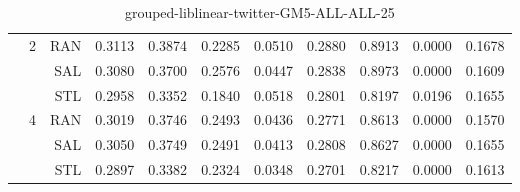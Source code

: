 \begin{center}
\begin{table}[htbp]
\begin{tabular}{ | r | r | r | r | r | r | r | r | r | r | r |}
 & \multirow{3}{*}{2} & RAN & 0.3113 & 0.3874 & 0.2285 & 0.0510 & 0.2880 & 0.8913 & 0.0000 & 0.1678\\ \cline{3-11}
 &   & SAL & 0.3080 & 0.3700 & 0.2576 & 0.0447 & 0.2838 & 0.8973 & 0.0000 & 0.1609\\ \cline{3-11}
 &   & STL & 0.2958 & 0.3352 & 0.1840 & 0.0518 & 0.2801 & 0.8197 & 0.0196 & 0.1655\\ \cline{2-11}
 & \multirow{3}{*}{4} & RAN & 0.3019 & 0.3746 & 0.2493 & 0.0436 & 0.2771 & 0.8613 & 0.0000 & 0.1570\\ \cline{3-11}
 &   & SAL & 0.3050 & 0.3749 & 0.2491 & 0.0413 & 0.2808 & 0.8627 & 0.0000 & 0.1655\\ \cline{3-11}
 &   & STL & 0.2897 & 0.3382 & 0.2324 & 0.0348 & 0.2701 & 0.8217 & 0.0000 & 0.1613\\ \cline{2-11}
\hline
\end{tabular}
\caption{grouped-liblinear-twitter-GM5-ALL-ALL-25}
\end{table}
\end{center}

